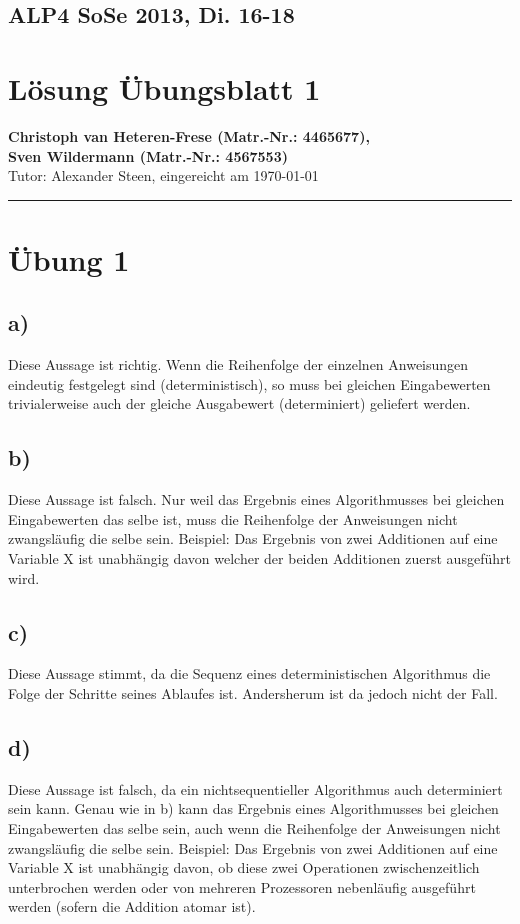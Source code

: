 \documentclass[11pt,a4paper,DIV=10,]{scrartcl}
\begin{document}
\onecolumn
\subsection*{ALP4 SoSe 2013, Di. 16-18}
\section*{Lösung Übungsblatt 1}
\textbf{Christoph van Heteren-Frese (Matr.-Nr.: 4465677), \\ Sven Wildermann (Matr.-Nr.: 4567553)}\\
Tutor: Alexander Steen, eingereicht am \today\\
\hrule

\section*{Übung 1}
\subsection*{a)}
Diese Aussage ist richtig. Wenn die Reihenfolge der einzelnen Anweisungen eindeutig festgelegt sind (deterministisch), so muss bei gleichen
Eingabewerten trivialerweise auch der gleiche Ausgabewert (determiniert) geliefert  werden. 
\subsection*{b)}
Diese Aussage ist falsch. Nur weil das Ergebnis eines Algorithmusses bei gleichen Eingabewerten das selbe ist, muss die Reihenfolge der Anweisungen
nicht zwangsläufig die selbe sein. Beispiel: Das Ergebnis von zwei Additionen auf eine Variable X ist unabhängig davon welcher der beiden Additionen
zuerst ausgeführt wird. 
\subsection*{c)}
Diese Aussage stimmt, da die Sequenz eines deterministischen Algorithmus die Folge der Schritte seines Ablaufes ist. Andersherum ist da jedoch nicht der Fall. 
\subsection*{d)}
Diese Aussage ist falsch, da ein nichtsequentieller Algorithmus auch determiniert sein kann. 
Genau wie in b) kann das Ergebnis eines Algorithmusses bei gleichen Eingabewerten das selbe sein, auch wenn die Reihenfolge der Anweisungen
nicht zwangsläufig die selbe sein. Beispiel: Das Ergebnis von zwei Additionen auf eine Variable X ist unabhängig davon, ob diese zwei Operationen
zwischenzeitlich unterbrochen werden oder von mehreren Prozessoren nebenläufig ausgeführt werden (sofern die Addition atomar ist). 
\end{document}
